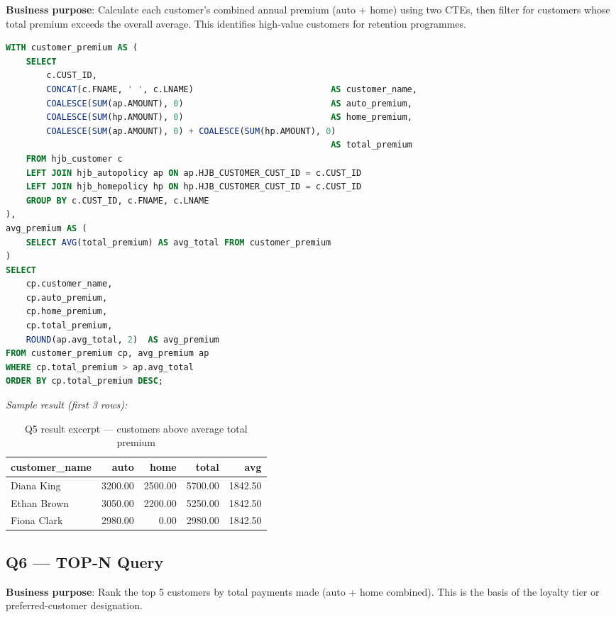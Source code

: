 \documentclass[12pt,letterpaper]{article}
\begin{document}
\textbf{Business purpose}: Calculate each customer's combined annual premium (auto + home) using two CTEs, then filter for customers whose total premium exceeds the overall average. This identifies high-value customers for retention programmes.

\begin{lstlisting}[language=SQL,caption={Q5: CTE to identify above-average premium customers}]
WITH customer_premium AS (
    SELECT
        c.CUST_ID,
        CONCAT(c.FNAME, ' ', c.LNAME)                           AS customer_name,
        COALESCE(SUM(ap.AMOUNT), 0)                             AS auto_premium,
        COALESCE(SUM(hp.AMOUNT), 0)                             AS home_premium,
        COALESCE(SUM(ap.AMOUNT), 0) + COALESCE(SUM(hp.AMOUNT), 0)
                                                                AS total_premium
    FROM hjb_customer c
    LEFT JOIN hjb_autopolicy ap ON ap.HJB_CUSTOMER_CUST_ID = c.CUST_ID
    LEFT JOIN hjb_homepolicy hp ON hp.HJB_CUSTOMER_CUST_ID = c.CUST_ID
    GROUP BY c.CUST_ID, c.FNAME, c.LNAME
),
avg_premium AS (
    SELECT AVG(total_premium) AS avg_total FROM customer_premium
)
SELECT
    cp.customer_name,
    cp.auto_premium,
    cp.home_premium,
    cp.total_premium,
    ROUND(ap.avg_total, 2)  AS avg_premium
FROM customer_premium cp, avg_premium ap
WHERE cp.total_premium > ap.avg_total
ORDER BY cp.total_premium DESC;
\end{lstlisting}

\textit{Sample result (first 3 rows):}
\begin{table}[H]
\centering\small
\begin{tabular}{lrrrr}
\toprule
\textbf{customer\_name} & \textbf{auto} & \textbf{home} & \textbf{total} & \textbf{avg} \\
\midrule
Diana King    & 3200.00 & 2500.00 & 5700.00 & 1842.50 \\
Ethan Brown   & 3050.00 & 2200.00 & 5250.00 & 1842.50 \\
Fiona Clark   & 2980.00 & 0.00    & 2980.00 & 1842.50 \\
\bottomrule
\end{tabular}
\caption{Q5 result excerpt --- customers above average total premium}
\end{table}

\subsection{Q6 --- TOP-N Query}

\textbf{Business purpose}: Rank the top 5 customers by total payments made (auto + home combined). This is the basis of the loyalty tier or preferred-customer designation.
\end{document}
